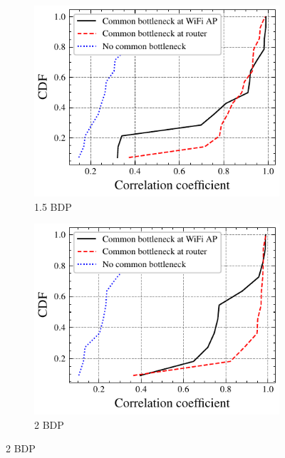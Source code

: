 \begin{figure}
  \begin{subfigure}{0.49\textwidth}
    \centering
    \includegraphics[width=\textwidth]{figures/bdp/bdp-15-no-only-video.pdf}
    \caption{\label{subfig:bdp-15}1.5 BDP}
  \end{subfigure}%
  \begin{subfigure}{0.49\textwidth}
    \centering
    \includegraphics[width=\textwidth]{figures/bdp/bdp-20-no-only-video.pdf}
    \caption{\label{subfig:bdp-20}2 BDP}
  \end{subfigure}%
\end{figure}

